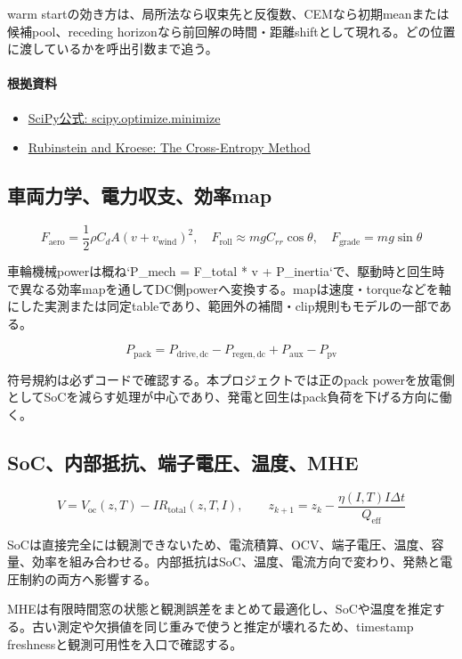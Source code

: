 \documentclass[a4paper,11pt]{article}
\begin{document}
warm startの効き方は、局所法なら収束先と反復数、CEMなら初期meanまたは候補pool、receding horizonなら前回解の時間・距離shiftとして現れる。どの位置に渡しているかを呼出引数まで追う。

\paragraph{根拠資料}
\begin{itemize}[leftmargin=1.6em]
\item \href{https://docs.scipy.org/doc/scipy/reference/generated/scipy.optimize.minimize.html}{SciPy公式: scipy.optimize.minimize}
\item \href{https://link.springer.com/book/10.1007/978-1-4757-4321-0}{Rubinstein and Kroese: The Cross-Entropy Method}
\end{itemize}

\subsection{車両力学、電力収支、効率map}
\[
F_{\mathrm{aero}}=\frac{1}{2}\rho C_dA(v+v_{\mathrm{wind}})^2,\quad F_{\mathrm{roll}}\approx mgC_{rr}\cos\theta,\quad F_{\mathrm{grade}}=mg\sin\theta
\]

車輪機械powerは概ね`P\_mech = F\_total * v + P\_inertia`で、駆動時と回生時で異なる効率mapを通してDC側powerへ変換する。mapは速度・torqueなどを軸にした実測または同定tableであり、範囲外の補間・clip規則もモデルの一部である。


\[
P_{\mathrm{pack}}=P_{\mathrm{drive,dc}}-P_{\mathrm{regen,dc}}+P_{\mathrm{aux}}-P_{\mathrm{pv}}
\]

符号規約は必ずコードで確認する。本プロジェクトでは正のpack powerを放電側としてSoCを減らす処理が中心であり、発電と回生はpack負荷を下げる方向に働く。



\subsection{SoC、内部抵抗、端子電圧、温度、MHE}
\[
V=V_{\mathrm{oc}}(z,T)-IR_{\mathrm{total}}(z,T,I),\qquad z_{k+1}=z_k-\frac{\eta(I,T)I\Delta t}{Q_{\mathrm{eff}}}
\]

SoCは直接完全には観測できないため、電流積算、OCV、端子電圧、温度、容量、効率を組み合わせる。内部抵抗はSoC、温度、電流方向で変わり、発熱と電圧制約の両方へ影響する。


MHEは有限時間窓の状態と観測誤差をまとめて最適化し、SoCや温度を推定する。古い測定や欠損値を同じ重みで使うと推定が壊れるため、timestamp freshnessと観測可用性を入口で確認する。
\end{document}
